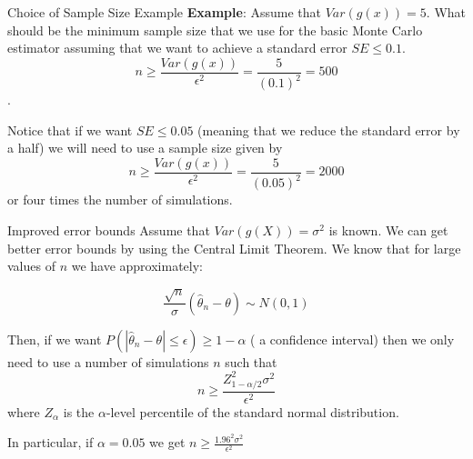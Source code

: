 \documentclass[8pt]{beamer}
\begin{document}
\begin{frame}{Choice of Sample Size Example}
\textbf{Example}: Assume that $Var(g(x))=5$.  What should be the minimum sample size that we use for the basic Monte Carlo estimator assuming that we want to achieve a standard error $SE\leq 0.1$.
$$n\geq \frac{Var(g(x))}{\epsilon^2}=\frac{5}{(0.1)^2}=500$$.

\vspace{3mm}

Notice that if we want $SE\leq 0.05$ (meaning that we reduce the standard error by a half) we will need to use a sample size given by 
$$n\geq \frac{Var(g(x))}{\epsilon^2}=\frac{5}{(0.05)^2}=2000$$
or four times the number of simulations.
\end{frame}

\begin{frame}{Improved error bounds}
Assume that $Var(g(X))=\sigma^2$ is known.  We can get better error bounds by using the Central Limit Theorem. We know that for large values of $n$ we have approximately:

\begin{equation*}
\frac{\sqrt{n}}{\sigma}\left(\hat{\theta}_n-\theta \right) \sim N(0,1)
\end{equation*}

Then, if we want $P\left(|\hat{\theta}_n-\theta|\leq \epsilon\right)\geq 1-\alpha$ ( a confidence interval) then we only need to use a number of simulations $n$ such that
\begin{equation*}
\displaystyle{n \geq \frac{Z_{1-\alpha/2}^2\sigma^2}{\epsilon ^2}}
\end{equation*}
where $Z_{\alpha}$ is the $\alpha$-level percentile of the standard normal distribution.

In particular, if $\alpha=0.05$ we get $\displaystyle{n \geq \frac{1.96^2 \sigma^2}{\epsilon ^2}}$
\end{frame}
\end{document}
